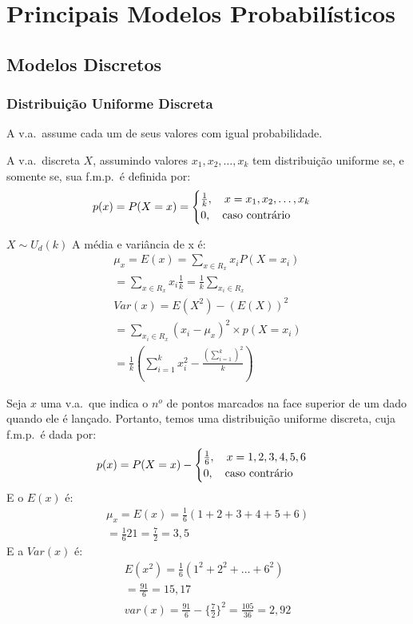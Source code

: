 \chapter{Principais Modelos Probabilísticos}
 \section{Modelos Discretos}
 \subsection{Distribuição Uniforme Discreta}
 \begin{description}
   \item  A v.a.\ assume cada um de seus valores com igual probabilidade.

   \item [Definição:] A v.a.\ discreta $X$, assumindo valores $x_1,x_2,\dots,x_k$ tem 
 distribuição uniforme se, e somente se, sua f.m.p.\ é definida por: 
 \begin{align}
   p(x)=P(X=x)=\begin{cases}
     \frac{1}{k}, \text{\quad} x=x_1,x_2,\dots,x_k\\
     0, \text{\quad caso contrário}
   \end{cases}
 \end{align}
\item  [Notação:] $X \sim U_{d}(k)$
 A média e variância de x é:
 \begin{align}
   \mu_{x}=E(x)=\sum_{x \in R_{x}}x_i P(X=x_i)\\ \nonumber
   = \sum_{x \in R_{x}}x_i \frac{1}{k}= \frac{1}{k}\sum_{x_i \in R_{x}}\\
   Var(x)=E(X^2)-\left(E(X)\right)^2\\ \nonumber
   = \sum_{x_i \in R_{x}}\left(x_i -\mu_x \right)^2 \times p\left(X=x_i \right)\\  
   =\frac{1}{k} \left(\sum^k_{i=1} x_i^2 - \frac{(\sum_{i=1}^k)^2}{k}\right) \nonumber
 \end{align}
\item [Exemplo:] Seja $x$ uma v.a.\ que indica o $n^o$ de pontos marcados na face 
 superior de um dado quando ele é lançado. Portanto, temos uma distribuição 
 uniforme discreta, cuja f.m.p.\ é dada por: 
 \begin{align}
   p(x)=P(X=x)-\begin{cases}
     \frac{1}{6},\text{\quad} x=1,2,3,4,5,6\\
     0, \text{\quad caso contrário}
   \end{cases}
 \end{align}
 E o $E(x)$ é: 
 \begin{align}
   \mu_{x}=E(x)=\frac{1}{6}(1+2+3+4+5+6)\\
   =\frac{1}{6}21= \frac{7}{2}=3,5
 \end{align}
 E a $Var(x)$ é:
 \begin{align}
   E(x^2)=\frac{1}{6}(1^2 + 2^2 + \dots + 6^2)\\
   =\frac{91}{6}=15,17\\
   var(x)=\frac{91}{6}- \{\frac{7}{2}\}^2=\frac{105}{36}=2,92
 \end{align}
 \end{description}
